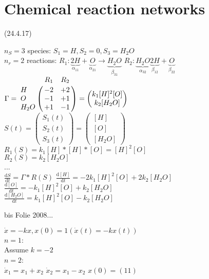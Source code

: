     \section{Chemical reaction networks}


    \begin{lecture}
      (24.4.17)
    \end{lecture}
    \begin{example}
      $n_S=3$ species: $S_1=H, S_2=0, S_3=H_2O$ \\
      $n_r=2$ reactions: $R_1: \underbrace{2H}_{\alpha_11} + \underbrace{O}_{\alpha_21} \longrightarrow \underbrace{H_2O}_{\beta_31}$
      $R_2: \underbrace{H_2O}_{\alpha_32} \underbrace{2H}_{\beta_12} + \underbrace{O}_{\beta_22}$
      $\Gamma = \bordermatrix{
        ~ & R_1 & R_2 \cr
        H & -2 & +2 \cr
        O & -1 & +1 \cr
        H_2O & +1 & -1 \cr}
      = \begin{pmatrix}
        k_1[H]^2[O] \\ k_2[H_2O]
      \end{pmatrix}$ \\
      $S(t) =
       \begin{pmatrix}
        S_1(t) \\ S_2(t) \\ S_3(t)
       \end{pmatrix}
       =
      \begin{pmatrix}
        [H] \\ [O] \\ [H_2O]
      \end{pmatrix}$ \\
      $R_1(S) = k_1[H]*[H]*[O] = [H]^2[O]$ \\
      $R_2(S) = k_2[H_2O]$ \\
      ...\\
      $\frac{\mathrm d S}{\mathrm d t} = \Gamma * R(S)$
      $\frac{\mathrm d [H]}{\mathrm d t} = -2k_1 [H]^2[O]+2k_2[H_2O]$ \\
      $\frac{\mathrm d [O]}{\mathrm d t} = -k_1 [H]^2[O]+k_2[H_2O]$ \\
      $\frac{\mathrm d [H_2O]}{\mathrm d t} = k_1 [H]^2[O]-k_2[H_2O]$ \\
    \end{example}

    bis Folie 2008...

    \begin{example}
      $\dot{x} = -kx, x(0)=1 (\dot{x}(t) = -kx(t))$ \\
      $n=1$: \\
      Assume $k=-2$  \\
      $n=2$: \\
      $\dot{x}_1 = x_1+x_2$
      $\dot{x}_2 = x_1-x_2$
      $x(0)= (1 1)$
    \end{example}

